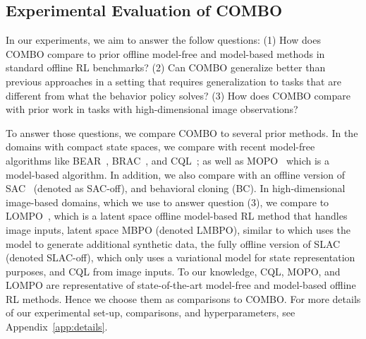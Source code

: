 \subsection{Experimental Evaluation of COMBO}
\label{sec:exp}

In our experiments, we aim to answer the follow questions: (1) How does COMBO compare to prior offline model-free and model-based methods in standard offline RL benchmarks? (2) Can COMBO generalize better than previous approaches in a setting that requires generalization to tasks that are different from what the behavior policy solves? (3) How does COMBO compare with prior work in tasks with high-dimensional image observations?

To answer those questions, we compare COMBO to several prior methods. In the domains with compact state spaces, we compare with recent model-free algorithms like BEAR~\citep{kumar2019stabilizing}, BRAC~\citep{wu2019behavior}, and CQL~\citep{kumar2020conservative}; as well as MOPO~\citep{yu2020mopo} which is a model-based algorithm. In addition, we also compare with an offline version of SAC~\citep{haarnoja2018soft} (denoted as SAC-off), and behavioral cloning (BC).
In high-dimensional image-based domains, which we use to answer question (3), we compare to LOMPO~\citep{Rafailov2020LOMPO}, which is a latent space offline model-based RL method that handles image inputs, latent space MBPO (denoted LMBPO), similar to \citet{janner2019trust} which uses the model to generate additional synthetic data, the fully offline version of SLAC \citep{lee2019SLAC} (denoted SLAC-off), which only uses a variational model for state representation purposes, and CQL from image inputs. To our knowledge, CQL, MOPO, and LOMPO are representative of state-of-the-art model-free and model-based offline RL methods. Hence we choose them as comparisons to COMBO. For more details of our experimental set-up, comparisons, and hyperparameters, see Appendix~\ref{app:details}.

